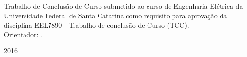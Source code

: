\begin{titlepage}
  \begin{center}
    {\large \MakeUppercase{\theauthor}}
  \end{center}

  \vfill

  \begin{center}
    {\Large \bfseries \MakeUppercase{\thetitle}}
  \end{center}
  \begin{flushright}
  	\begin{minipage}{0.5\textwidth}
  		Trabalho de Conclusão de Curso submetido ao curso de Engenharia Elétrica da Universidade Federal de Santa Catarina como requisito para aprovação da disciplina EEL7890 - Trabalho de conclusão de Curso (TCC).\\ Orientador: \theadvisor.
  	\end{minipage}
  \end{flushright}
  

  \vfill

  \begin{center}
    {\large \bfseries \MakeUppercase{\theplace} \par 2016}
  \end{center}
\end{titlepage}
